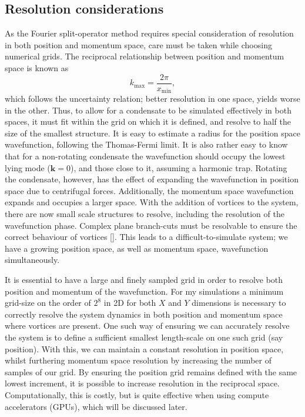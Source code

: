 \subsection{Resolution considerations}
As the Fourier split-operator method requires special consideration of resolution in both position and momentum space, care must be taken while choosing numerical grids. The reciprocal relationship between position and momentum space is known as \begin{equation}
    k_{\text{max}} = \frac{2\pi}{x_{\text{min}}},
\end{equation}
which follows the uncertainty relation; better resolution in one space, yields worse in the other. Thus, to allow for a condensate to be simulated effectively in both spaces, it must fit within the grid on which it is defined, and resolve to half the size of the smallest structure. It is easy to estimate a radius for the position space wavefunction, following the Thomas-Fermi limit. It is also rather easy to know that for a non-rotating condensate the wavefunction should occupy the lowest lying mode ($\mathbf{k}=0$), and those close to it, assuming a harmonic trap. Rotating the condensate, however, has the effect of expanding the wavefunction in position space due to centrifugal forces. Additionally, the momentum space wavefunction expands and occupies a larger space. With the addition of vortices to the system, there are now small scale structures to resolve, including the resolution of the wavefunction phase. Complex plane branch-cuts must be resolvable to ensure the correct behaviour of vortices []. This leads to a difficult-to-simulate system; we have a growing position space, as well as momentum space, wavefunction simultaneously.

It is essential to have a large and finely sampled grid in order to resolve both position and momentum of the wavefunction. For my simulations a minimum grid-size on the order of $2^8$ in 2D for both $X$ and $Y$ dimensions is necessary to correctly resolve the system dynamics in both position and momentum space where vortices are present. One such way of ensuring we can accurately resolve the system is to define a sufficient smallest length-scale on one such grid (say position). With this, we can maintain a constant resolution in position space, whilst furthering momentum space resolution by increasing the number of samples of our grid. By ensuring the position grid remains defined with the same lowest increment, it is possible to increase resolution in the reciprocal space. Computationally, this is costly, but is quite effective when using compute accelerators (GPUs), which will be discussed later. %
